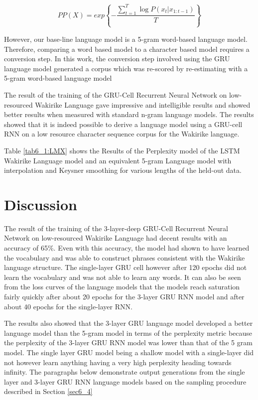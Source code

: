 \begin{equation}
    PP(X)=exp\left\{−\frac{\sum_{t=1}^T\log P(x_t|x_{1:t−1})}{T}\right\}
\label{ch5_eq3_ppx}
\end{equation}

However, our base-line language model is a 5-gram word-based language model.  Therefore, comparing a word based model to a character based model requires a conversion step. In this work, the conversion step involved using the GRU language model generated a corpus which was re-scored by re-estimating with a 5-gram word-based language model

The result of the training of the GRU-Cell Recurrent Neural Network on low-resourced Wakirike Language gave impressive and intelligible results and showed better results when measured with standard n-gram language models. The results showed that it is indeed possible to derive a language model using a GRU-cell RNN on a low resource character sequence corpus for the Wakirike language.
\stopblue

Table \ref{tab6_1:LMX} shows the Results of the Perplexity model of the LSTM Wakirike Language model and an equivalent 5-gram Language model with interpolation and Keysner smoothing \citep{chen1996empirical} for various lengths of the held-out data.
\startblue
\section{Discussion}
The result of the training of the 3-layer-deep GRU-Cell Recurrent Neural Network on low-resourced Wakirike Language had decent results with an accuracy of 65\%.  Even with this accuracy, the model had shown to have learned the vocabulary and was able to construct phrases consistent with the Wakirike language structure.  The single-layer GRU cell however after 120 epochs did not learn the vocabulary and was not able to learn any words.  It can also be seen from the loss curves of the language models that the models reach saturation fairly quickly after about 20 epochs for the 3-layer GRU RNN model and after about 40 epochs for the single-layer RNN.


The results also showed that the 3-layer GRU language model developed a better language model than the 5-gram model in terms of the perplexity metric because the perplexity of the 3-layer GRU RNN model was lower than that of the 5 gram model.  The single layer GRU model being a shallow model with a single-layer did not however learn anything having a  very high perplexity heading towards infinity.  The paragraphs below demonstrate output generations from the single layer and 3-layer GRU RNN language models based on the sampling procedure described in Section \ref{sec6_4}

